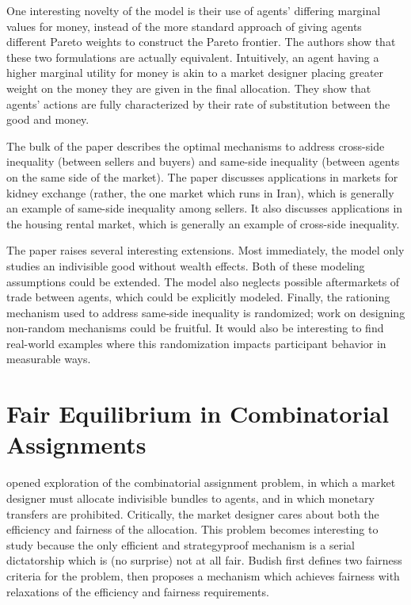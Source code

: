 \documentclass[JEL]{AEA}
\begin{document}
One interesting novelty of the \cite{dworczak-2020} model is their use of agents' differing marginal values for money, instead of the more standard approach of giving agents different Pareto weights to construct the Pareto frontier. The authors show that these two formulations are actually equivalent. Intuitively, an agent having a higher marginal utility for money is akin to a market designer placing greater weight on the money they are given in the final allocation. They show that agents' actions are fully characterized by their rate of substitution between the good and money.

The bulk of the paper describes the optimal mechanisms to address cross-side inequality (between sellers and buyers) and same-side inequality (between agents on the same side of the market). The paper discusses applications in markets for kidney exchange (rather, the one market which runs in Iran), which is generally an example of same-side inequality among sellers. It also discusses applications in the housing rental market, which is generally an example of cross-side inequality.


The paper raises several interesting extensions. Most immediately, the model only studies an indivisible good without wealth effects. Both of these modeling assumptions could be extended. The model also neglects possible aftermarkets of trade between agents, which could be explicitly modeled. Finally, the rationing mechanism used to address same-side inequality is randomized; work on designing non-random mechanisms could be fruitful. It would also be interesting to find real-world examples where this randomization impacts participant behavior in measurable ways.

\section{Fair Equilibrium in Combinatorial Assignments}

\cite{budish-2011} opened exploration of the combinatorial assignment problem, in which a market designer must allocate indivisible bundles to agents, and in which monetary transfers are prohibited. Critically, the market designer cares about both the efficiency and fairness of the allocation. This problem becomes interesting to study because the only efficient and strategyproof mechanism is a serial dictatorship which is (no surprise) not at all fair. Budish first defines two fairness criteria for the problem, then proposes a mechanism which achieves fairness with relaxations of the efficiency and fairness requirements.
\end{document}
